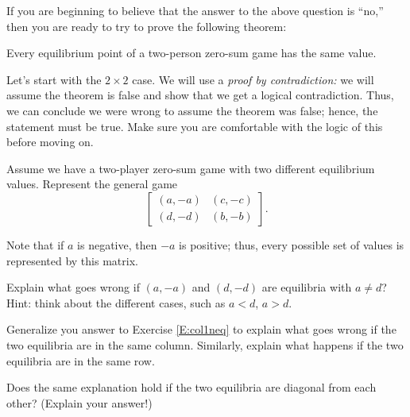 If you are beginning to believe that the answer to the above question is ``no,'' then you are ready to try to prove the following theorem:
\vspace{.1in}

\begin{main} Every equilibrium point of a two-person zero-sum game has the same value. 
\end{main}


Let's start with the $2 \times 2$ case. We will use a \emph{proof by contradiction:} we will assume the theorem is false and show that we get a logical contradiction. Thus, we can conclude we were wrong to assume the theorem was false; hence, the statement must be true. Make sure you are comfortable with the logic of this before moving on.

Assume we have a two-player zero-sum game with two different equilibrium values. Represent the general game 
\[\left[\begin{matrix}
(a, -a)&(c, -c)\\
(d, -d)&(b, -b)

\end{matrix}\right].\]

Note that if $a$ is negative, then $-a$ is positive; thus, every possible set of values is represented by this matrix.


\begin{xca}\label{E:col1neq}
Explain what goes wrong if $(a, -a)$ and $(d, -d)$ are equilibria with $a \neq d$? Hint: think about the different cases, such as $a<d$, $a>d$. 
\end{xca}

\begin{xca}\label{E:gencolneq}
Generalize you answer to Exercise \ref{E:col1neq} to explain what goes wrong if the two equilibria are in the same column. Similarly, explain what happens if the two equilibria are in the  same row.
\end{xca}

\begin{xca}\label{E:diag}
Does the same explanation hold if the two equilibria are diagonal from each other? (Explain your answer!)
\end{xca}


